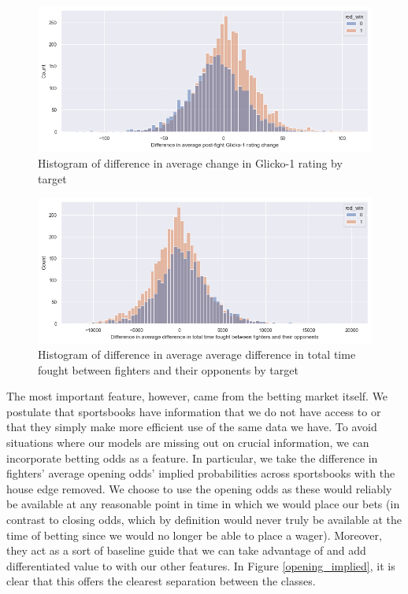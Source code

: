 \documentclass[12pt,twoside]{report}
\begin{document}
\begin{figure}[!htb]
    \centering
    \includegraphics[width=\linewidth]{figures/glicko_1.png}
    \caption{Histogram of difference in average change in Glicko-1 rating by target}
\end{figure}

\begin{figure}[!htb]
    \centering
    \includegraphics[width=\linewidth]{figures/super_convoluted_feature.png}
    \caption{Histogram of difference in average average difference in total time fought between fighters and their opponents by target}
\end{figure}


The most important feature, however, came from the betting market itself. We postulate that sportsbooks have information that we do not have access to or that they simply make more efficient use of the same data we have. To avoid situations where our models are missing out on crucial information, we can incorporate betting odds as a feature. In particular, we take the difference in fighters' average opening odds' implied probabilities across sportsbooks with the house edge removed. We choose to use the opening odds as these would reliably be available at any reasonable point in time in which we would place our bets (in contrast to closing odds, which by definition would never truly be available at the time of betting since we would no longer be able to place a wager). Moreover, they act as a sort of baseline guide that we can take advantage of and add differentiated value to with our other features. In Figure \ref{opening_implied}, it is clear that this offers the clearest separation between the classes.
\end{document}
